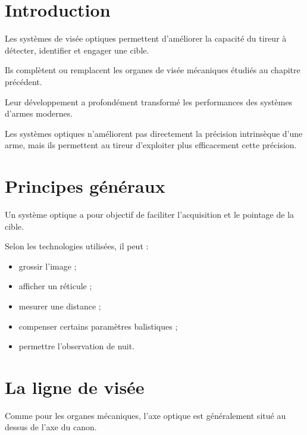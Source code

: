 
\section{Introduction}

Les systèmes de visée optiques permettent d'améliorer la capacité du tireur à
détecter, identifier et engager une cible.

Ils complètent ou remplacent les organes de visée mécaniques étudiés au
chapitre précédent.

Leur développement a profondément transformé les performances des systèmes
d'armes modernes.

\begin{aretenir}

Les systèmes optiques n'améliorent pas directement la précision intrinsèque
d'une arme, mais ils permettent au tireur d'exploiter plus efficacement cette
précision.

\end{aretenir}

\section{Principes généraux}

Un système optique a pour objectif de faciliter l'acquisition et le pointage
de la cible.

Selon les technologies utilisées, il peut :

\begin{itemize}
    \item grossir l'image ;
    \item afficher un réticule ;
    \item mesurer une distance ;
    \item compenser certains paramètres balistiques ;
    \item permettre l'observation de nuit.
\end{itemize}

\section{La ligne de visée}

Comme pour les organes mécaniques, l'axe optique est généralement situé au
dessus de l'axe du canon.

